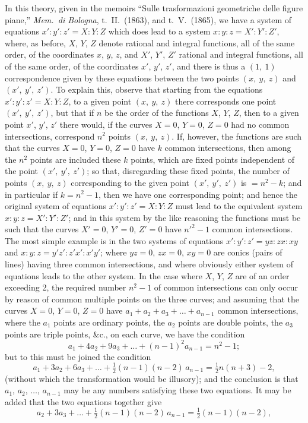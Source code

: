 \documentclass[12pt,a4paper,oneside]{book}
\begin{document}
In this theory, given in the memoirs ``Sulle trasformazioni geometriche delle figure piane,'' \textit{Mem.\ di Bologna}, t.~II.\ (1863), and t.~V.\ (1865), we have a system of equations $x':y':z'=X:Y:Z$ which does lead to a system $x:y:z=X':Y':Z'$, where, as before, $X$, $Y$, $Z$ denote rational and integral functions, all of the same order, of the coordinates $x$, $y$, $z$, and $X'$, $Y'$, $Z'$ rational and integral functions, all of the same order, of the coordinates $x'$, $y'$, $z'$, and there is thus a $(1,\ 1)$ correspondence given by these equations between the two points $(x,\ y,\ z)$ and $(x',\ y',\ z')$. To explain this, observe that starting from the equations $x':y':z'=X:Y:Z$, to a given point $(x,\ y,\ z)$ there corresponds one point $(x',\ y',\ z')$, but that if $n$ be the order of the functions $X$, $Y$, $Z$, then to a given point $x'$, $y'$, $z'$ there would, if the curves $X=0$, $Y=0$, $Z=0$ had no common intersections, correspond $n^{2}$ points $(x,\ y,\ z)$. If, however, the functions are such that the curves $X=0$, $Y=0$, $Z=0$ have $k$ common intersections, then among the $n^{2}$ points are included these $k$ points, which are fixed points independent of the point $(x',\ y',\ z')$; so that, disregarding these fixed points, the number of points $(x,\ y,\ z)$ corresponding to the given point $(x',\ y',\ z')$ is $=n^{2}-k$; and in particular if $k=n^{2}-1$, then we have one corresponding point; and hence the original system of equations $x':y':z'=X:Y:Z$ must lead to the equivalent system $x:y:z=X':Y':Z'$; and in this system by the like reasoning the functions must be such that the curves $X'=0$, $Y'=0$, $Z'=0$ have $n'^{2}-1$ common intersections. The most simple example is in the two systems of equations $x':y':z'=yz:zx:xy$ and $x:y:z=y'z':z'x':x'y'$; where $yz=0$, $zx=0$, $xy=0$ are conics (pairs of lines) having three common intersections, and where obviously either system of equations leads to the other system. In the case where $X$, $Y$, $Z$ are of an order exceeding 2, the required number $n^{2}-1$ of common intersections can only occur by reason of common multiple points on the three curves; and assuming that the curves $X=0$, $Y=0$, $Z=0$ have $a_{1}+a_{2}+a_{3}+\dots+a_{n-1}$ common intersections, where the $a_{1}$ points are ordinary points, the $a_{2}$ points are double points, the $a_{3}$ points are triple points, \&c., on each curve, we have the condition
\[
a_{1}+4a_{2}+9a_{3}+\dots+(n-1)^{2}a_{n-1}=n^{2}-1;
\]
but to this must be joined the condition
\[
a_{1}+3a_{2}+6a_{3}+\dots+\tfrac{1}{2}(n-1)(n-2)\,a_{n-1}=\tfrac{1}{2}n(n+3)-2,
\]
(without which the transformation would be illusory); and the conclusion is that $a_{1}$, $a_{2}$, $\dots$, $a_{n-1}$ may be any numbers satisfying these two equations. It may be added that the two equations together give
\[
a_{2}+3a_{3}+\dots+\tfrac{1}{2}(n-1)(n-2)\,a_{n-1}=\tfrac{1}{2}(n-1)(n-2),
\]
\end{document}
